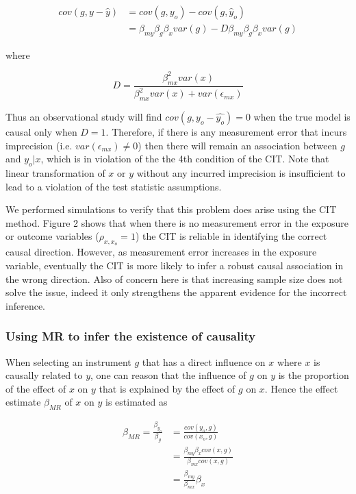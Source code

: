 \documentclass[]{article}
\begin{document}
\[
\begin{aligned}
cov(g, y - \hat{y}) & = cov(g, y_o) - cov(g, \hat{y}_o)  \\
                    & = \beta_{my} \beta_g \beta_x var(g) - D \beta_{my} \beta_g \beta_x var(g)
\end{aligned}
\]

where

\[
D = \frac{\beta^2_{mx} var(x)} {\beta^2_{mx} var(x) + var(\epsilon_{mx})}
\]

Thus an observational study will find \(cov(g, y_o - \hat{y_o}) = 0\)
when the true model is causal only when \(D = 1\). Therefore, if there
is any measurement error that incurs imprecision (i.e.
\(var(\epsilon_{mx}) \neq 0\)) then there will remain an association
between \(g\) and \(y_o | x\), which is in violation of the the 4th
condition of the CIT. Note that linear transformation of \(x\) or \(y\)
without any incurred imprecision is insufficient to lead to a violation
of the test statistic assumptions.

We performed simulations to verify that this problem does arise using
the CIT method. Figure 2 shows that when there is no measurement error
in the exposure or outcome variables (\(\rho_{x, x_o}=1\)) the CIT is
reliable in identifying the correct causal direction. However, as
measurement error increases in the exposure variable, eventually the CIT
is more likely to infer a robust causal association in the wrong
direction. Also of concern here is that increasing sample size does not
solve the issue, indeed it only strengthens the apparent evidence for
the incorrect inference.

\subsubsection{Using MR to infer the existence of
causality}\label{using-mr-to-infer-the-existence-of-causality}

When selecting an instrument \(g\) that has a direct influence on \(x\)
where \(x\) is causally related to \(y\), one can reason that the
influence of \(g\) on \(y\) is the proportion of the effect of \(x\) on
\(y\) that is explained by the effect of \(g\) on \(x\). Hence the
effect estimate \(\beta_{MR}\) of \(x\) on \(y\) is estimated as

\[
\begin{aligned}
\beta_{MR} = \frac{\beta_{y_o}}{\beta_g} & = \frac{cov(y_o, g)}{cov(x_o, g)} \\
                                         & = \frac{\beta_{my} \beta_x cov(x, g)} {\beta_{mx} cov(x, g)} \\
                                         & = \frac{\beta_{my}} {\beta_{mx}} \beta_x
\end{aligned}
\]
\end{document}
